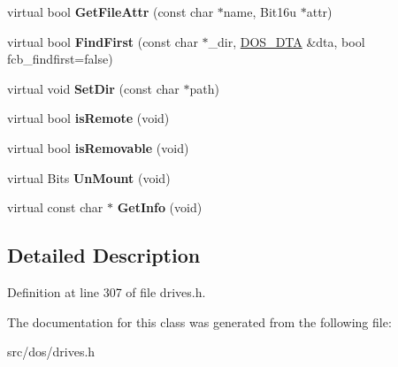 \begin{DoxyCompactItemize}
\item 
\hypertarget{classphysfscdromDrive_ab912fc3e100db700805d05cd06716630}{virtual bool {\bfseries Get\-File\-Attr} (const char $\ast$name, Bit16u $\ast$attr)}\label{classphysfscdromDrive_ab912fc3e100db700805d05cd06716630}

\item 
\hypertarget{classphysfscdromDrive_ae13118f6b51622e933dc536ecea57258}{virtual bool {\bfseries Find\-First} (const char $\ast$\-\_\-dir, \hyperlink{classDOS__DTA}{D\-O\-S\-\_\-\-D\-T\-A} \&dta, bool fcb\-\_\-findfirst=false)}\label{classphysfscdromDrive_ae13118f6b51622e933dc536ecea57258}

\item 
\hypertarget{classphysfscdromDrive_ac73dc48b4346379edcdc2c42c502380a}{virtual void {\bfseries Set\-Dir} (const char $\ast$path)}\label{classphysfscdromDrive_ac73dc48b4346379edcdc2c42c502380a}

\item 
\hypertarget{classphysfscdromDrive_a39c3bc30452a8ecea465111831e5e7a6}{virtual bool {\bfseries is\-Remote} (void)}\label{classphysfscdromDrive_a39c3bc30452a8ecea465111831e5e7a6}

\item 
\hypertarget{classphysfscdromDrive_a2fd25800d56f447a0ec1550ec90a24ff}{virtual bool {\bfseries is\-Removable} (void)}\label{classphysfscdromDrive_a2fd25800d56f447a0ec1550ec90a24ff}

\item 
\hypertarget{classphysfscdromDrive_a99c7363ec5b3a0ca597c10e4f6dc2ecc}{virtual Bits {\bfseries Un\-Mount} (void)}\label{classphysfscdromDrive_a99c7363ec5b3a0ca597c10e4f6dc2ecc}

\item 
\hypertarget{classphysfscdromDrive_ad222bd4e5f133f63e2dd3713384298b8}{virtual const char $\ast$ {\bfseries Get\-Info} (void)}\label{classphysfscdromDrive_ad222bd4e5f133f63e2dd3713384298b8}

\end{DoxyCompactItemize}


\subsection{Detailed Description}


Definition at line 307 of file drives.\-h.



The documentation for this class was generated from the following file\-:\begin{DoxyCompactItemize}
\item 
src/dos/drives.\-h\end{DoxyCompactItemize}
